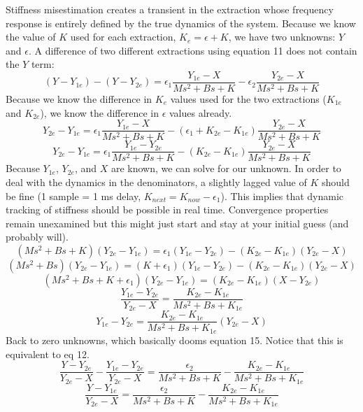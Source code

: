 \documentclass[10pt]{article}
\begin{document}
Stiffness misestimation creates a transient in the extraction whose frequency response is entirely defined by the true dynamics of the system. Because we know the value of $K$ used for each extraction, $K_e=\epsilon+K$, we have two unknowns: $Y$ and $\epsilon$. A difference of two different extractions using equation 11 does not contain the $Y$ term:
\begin{equation}
(Y-Y_{1e})-(Y-Y_{2e})=\epsilon_1 \frac{Y_{1e}-X}{Ms^2+Bs+K}- \epsilon_2 \frac{Y_{2e}-X}{Ms^2+Bs+K}
\end{equation}
Because we know the difference in $K_e$ values used for the two extractions ($K_{1e}$ and $K_{2e}$), we know the difference in $\epsilon$ values already.
\begin{equation}
Y_{2e}-Y_{1e}=\epsilon_1 \frac{Y_{1e}-X}{Ms^2+Bs+K}-(\epsilon_1+K_{2e}-K_{1e}) \frac{Y_{2e}-X}{Ms^2+Bs+K}
\end{equation}
\begin{equation}
Y_{2e}-Y_{1e}=\epsilon_1 \frac{Y_{1e}-Y_{2e}}{Ms^2+Bs+K}-(K_{2e}-K_{1e}) \frac{Y_{2e}-X}{Ms^2+Bs+K}
\end{equation}
Because $Y_{1e}$, $Y_{2e}$, and $X$ are known, we can solve for our unknown. In order to deal with the dynamics in the denominators, a slightly lagged value of $K$ should be fine (1 sample = 1 ms delay, $K_{next}=K_{now}-\epsilon_1$). This implies that dynamic tracking of stiffness should be possible in real time. Convergence properties remain unexamined but this might just start and stay at your initial guess (and probably will).
\begin{equation}
(Ms^2+Bs+K)(Y_{2e}-Y_{1e})=\epsilon_1 (Y_{1e}-Y_{2e})-(K_{2e}-K_{1e})(Y_{2e}-X)
\end{equation}
\begin{equation}
(Ms^2+Bs)(Y_{2e}-Y_{1e})=(K+\epsilon_1)(Y_{1e}-Y_{2e})-(K_{2e}-K_{1e})(Y_{2e}-X)
\end{equation}
\begin{equation}
(Ms^2+Bs+K+\epsilon_1)(Y_{2e}-Y_{1e})=(K_{2e}-K_{1e})(X-Y_{2e})
\end{equation}
\begin{equation}
\frac{Y_{1e}-Y_{2e}}{Y_{2e}-X}=\frac{K_{2e}-K_{1e}}{Ms^2+Bs+K_{1e}}
\end{equation}
\begin{equation}
Y_{1e}-Y_{2e}=\frac{K_{2e}-K_{1e}}{Ms^2+Bs+K_{1e}}(Y_{2e}-X)
\end{equation}
Back to zero unknowns, which basically dooms equation 15. Notice that this is equivalent to eq 12.
\begin{equation}
\frac{Y-Y_{2e}}{Y_{2e}-X}-\frac{Y_{1e}-Y_{2e}}{Y_{2e}-X}=\frac{\epsilon_2}{Ms^2+Bs+K}-\frac{K_{2e}-K_{1e}}{Ms^2+Bs+K_{1e}}
\end{equation}
\begin{equation}
\frac{Y-Y_{1e}}{Y_{2e}-X}=\frac{\epsilon_2}{Ms^2+Bs+K}-\frac{K_{2e}-K_{1e}}{Ms^2+Bs+K_{1e}}
\end{equation}
\end{document}

